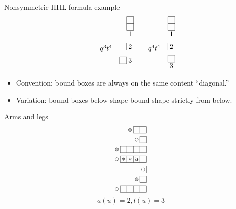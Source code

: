 \documentclass[dvipsnames]{beamer}
\theoremstyle{definition}
\newcounter{c}
\begin{document}
\begin{frame}{Nonsymmetric HHL formula example}
\begin{equation*}
\begin{array}{rcrcrcrcrcrcrcrc}
\begin{tikzpicture}[scale=.35,baseline=.85cm]
\end{tikzpicture}
& \quad   q^{3} t^{4} &
\begin{tikzpicture}[scale=.35,baseline=.85cm]
  \draw[yshift=4.25cm] (0,1) grid (1,3); \node at (.5,4.75) {1};
  \draw[yshift=2.5cm] (0,0) grid (0,1); \node at (.5,3) {2};
  \draw[yshift=.5cm] (-1,0) grid (0,1); \node at (.5,1) {3};
\end{tikzpicture}
& \quad  q^{4} t^{4}  &
\begin{tikzpicture}[scale=.35,baseline=.85cm]
  \draw[yshift=4.25cm] (0,1) grid (1,3); \node at (.5,4.75) {1};
  \draw[yshift=2.5cm] (0,0) grid (0,1); \node at (.5,3) {2};
  \draw[yshift=.75cm] (0,0) grid (1,1); \node at (.5,.25) {3};
\end{tikzpicture}
\end{array}
\end{equation*}
\begin{itemize}
\item Convention: bound boxes are always on the same content
  ``diagonal.''
\item Variation: bound boxes below shape bound shape strictly from below.
\end{itemize}
\end{frame}
\begin{frame}{Arms and legs}
  \begin{equation*}\label{e:arms-and-legs}
\begin{tikzpicture}[scale=.33,baseline=5*.33cm]
\foreach  \mu / \y in {2/9, 1/7.5, 4/6, 4/4.5, 0/3, 1/1.5, 4/0}
  \draw[xshift=-.5cm, yshift=\y cm] (-\mu,0) grid (0,1);
\node at (-2,5) {$u$};
\node at (-3,5) {$*$};
\node at (-4,5) {$*$};
\filldraw[color=black, fill=gray!50] (-3,9.5) circle (.25) (-5,6.5)
circle (.25) (-2,2) circle (.25);
\draw (-2,8) circle (.25) (-5,5) circle (.25) (-1,3.5) circle (.25)
(-5,.5) circle (.25);
\end{tikzpicture}
\vspace{1cm}
\end{equation*}
\[
  a(u) = 2, l(u) = 3
\]
\end{frame}
\end{document}
